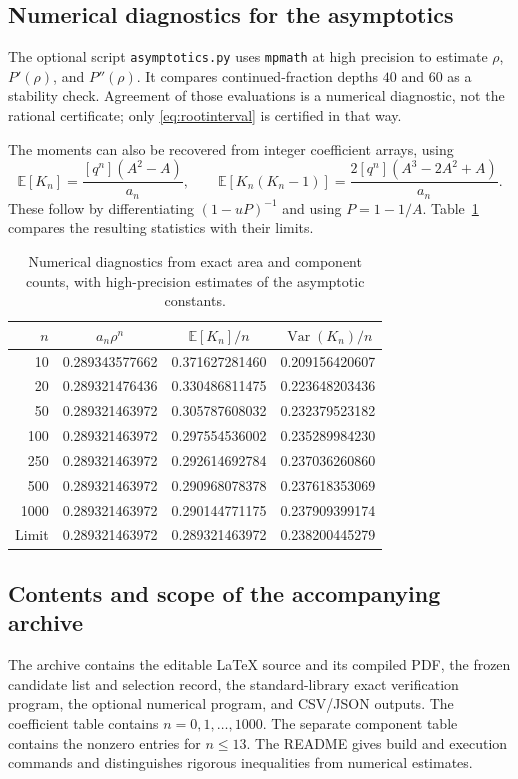 \documentclass[11pt,letterpaper]{article}
\numberwithin{equation}{section}
\theoremstyle{definition}
\newcommand{\E}{\mathbb E}
\newcommand{\Var}{\operatorname{Var}}
\begin{document}
\subsection{Numerical diagnostics for the asymptotics}
The optional script \texttt{asymptotics.py} uses \texttt{mpmath} at high
precision to estimate $\rho$, $P'(\rho)$, and $P''(\rho)$. It compares
continued-fraction depths $40$ and $60$ as a stability check. Agreement of
those evaluations is a numerical diagnostic, not the rational certificate;
only \eqref{eq:rootinterval} is certified in that way.

The moments can also be recovered from integer coefficient arrays, using
\begin{equation}
 \E[K_n]=\frac{[q^n](A^2-A)}{a_n},\qquad
 \E[K_n(K_n-1)]=\frac{2[q^n](A^3-2A^2+A)}{a_n}.
 \label{eq:exactmoments}
\end{equation}
These follow by differentiating $(1-uP)^{-1}$ and using $P=1-1/A$.
Table~\ref{tab:asymptotic} compares the resulting statistics with their
limits.

\begin{table}[htbp]
\centering\small
\begin{tabular}{@{}r c c c@{}}
\toprule
$n$ & $a_n\rho^n$ & $\E[K_n]/n$ & $\Var(K_n)/n$\\
\midrule
10 & 0.289343577662 & 0.371627281460 & 0.209156420607\\
20 & 0.289321476436 & 0.330486811475 & 0.223648203436\\
50 & 0.289321463972 & 0.305787608032 & 0.232379523182\\
100 & 0.289321463972 & 0.297554536002 & 0.235289984230\\
250 & 0.289321463972 & 0.292614692784 & 0.237036260860\\
500 & 0.289321463972 & 0.290968078378 & 0.237618353069\\
1000 & 0.289321463972 & 0.290144771175 & 0.237909399174\\
\midrule
Limit & 0.289321463972 & 0.289321463972 & 0.238200445279\\
\bottomrule
\end{tabular}
\caption{Numerical diagnostics from exact area and component counts, with
high-precision estimates of the asymptotic constants.}
\label{tab:asymptotic}
\end{table}

\subsection{Contents and scope of the accompanying archive}
The archive contains the editable \LaTeX{} source and its compiled PDF,
the frozen candidate list and selection record, the standard-library exact
verification program, the optional numerical program, and CSV/JSON outputs.
The coefficient table contains $n=0,1,\ldots,1000$. The separate component
table contains the nonzero entries for $n\le13$. The README gives build and
execution commands and distinguishes rigorous inequalities from numerical
estimates.
\end{document}
